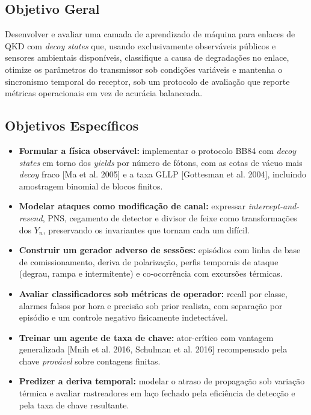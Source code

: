 \documentclass[12pt]{article}
\begin{document}
\subsection{Objetivo Geral}

Desenvolver e avaliar uma camada de aprendizado de máquina para enlaces de QKD
com \emph{decoy states} que, usando exclusivamente observáveis públicos e
sensores ambientais disponíveis, classifique a causa de degradações no enlace,
otimize os parâmetros do transmissor sob condições variáveis e mantenha o
sincronismo temporal do receptor, sob um protocolo de avaliação que reporte
métricas operacionais em vez de acurácia balanceada.

\subsection{Objetivos Específicos}

\begin{itemize}[leftmargin=1.6em]
  \item \textbf{Formular a física observável:} implementar o protocolo BB84 com
  \emph{decoy states} em torno dos \emph{yields} por número de fótons, com as
  cotas de vácuo mais \emph{decoy} fraco [Ma et al. 2005] e a taxa GLLP
  [Gottesman et al. 2004], incluindo amostragem binomial de blocos finitos.
  \item \textbf{Modelar ataques como modificação de canal:} expressar
  \emph{intercept-and-resend}, PNS, cegamento de detector e divisor de feixe como
  transformações dos $Y_n$, preservando os invariantes que tornam cada um difícil.
  \item \textbf{Construir um gerador adverso de sessões:} episódios com linha de
  base de comissionamento, deriva de polarização, perfis temporais de ataque
  (degrau, rampa e intermitente) e co-ocorrência com excursões térmicas.
  \item \textbf{Avaliar classificadores sob métricas de operador:} recall por
  classe, alarmes falsos por hora e precisão sob prior realista, com separação
  por episódio e um controle negativo fisicamente indetectável.
  \item \textbf{Treinar um agente de taxa de chave:} ator-crítico com vantagem
  generalizada [Mnih et al. 2016, Schulman et al. 2016] recompensado pela chave
  \emph{provável} sobre contagens finitas.
  \item \textbf{Predizer a deriva temporal:} modelar o atraso de propagação sob
  variação térmica e avaliar rastreadores em laço fechado pela eficiência de
  detecção e pela taxa de chave resultante.
\end{itemize}
\end{document}
